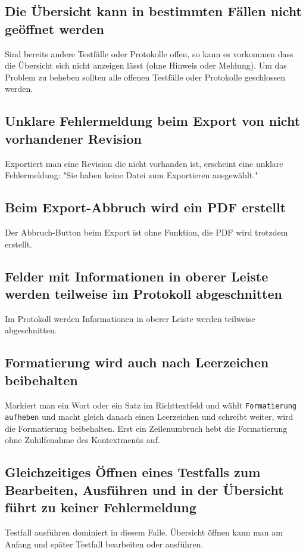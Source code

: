 \documentclass[11pt,a4paper,titlepage]{article}
\begin{document}
\subsection*{Die Übersicht kann in bestimmten Fällen nicht geöffnet werden}
Sind bereits andere Testfälle oder Protokolle offen, so kann es vorkommen dass die Übersicht sich nicht anzeigen lässt (ohne Hinweis oder Meldung). Um das Problem zu beheben sollten alle offenen Testfälle oder Protokolle geschlossen werden.

\subsection*{Unklare Fehlermeldung beim Export von nicht vorhandener Revision}
Exportiert man eine Revision die nicht vorhanden ist, erscheint eine unklare Fehlermeldung: "Sie haben keine Datei zum Exportieren ausgewählt."

\subsection*{Beim Export-Abbruch wird ein PDF erstellt}
Der Abbruch-Button beim Export ist ohne Funktion, die PDF wird trotzdem erstellt.

\subsection*{Felder mit Informationen in oberer Leiste werden teilweise im Protokoll abgeschnitten}
Im Protokoll werden Informationen in oberer Leiste werden teilweise abgeschnitten.

\subsection*{Formatierung wird auch nach Leerzeichen beibehalten}
Markiert man ein Wort oder ein Satz im Richttextfeld und wählt \texttt{Formatierung aufheben} und macht gleich danach einen Leerzeichen und schreibt weiter, wird die Formatierung beibehalten.
Erst ein Zeilenumbruch hebt die Formatierung ohne Zuhilfenahme des Kontextmenüs auf.

\subsection*{Gleichzeitiges Öffnen eines Testfalls zum Bearbeiten, Ausführen und in der Übersicht führt zu keiner Fehlermeldung}
Testfall ausführen dominiert in diesem Falle. Übersicht öffnen kann man am Anfang und später Testfall bearbeiten oder ausführen.
\end{document}

